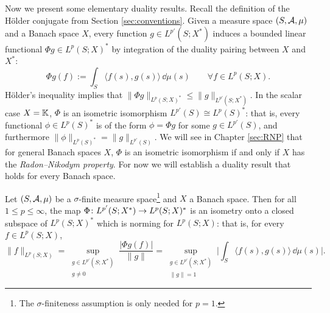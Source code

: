 Now we present some elementary duality results.
Recall the definition of the H\"older conjugate from Section \ref{sec:conventions}.
Given a measure space $(S,\mathcal{A},\mu)$ and a Banach space $X$, every function $g \in L^{p'}(S;X^*)$ induces a bounded linear functional $\Phi g \in L^p(S;X)^*$ by integration of the duality pairing between $X$ and $X^*$:
\begin{equation*}
  \Phi g(f) := \int_S \langle f(s), g(s) \rangle \, \dd\mu(s) \qquad \forall f \in L^p(S;X).
\end{equation*}
H\"older's inequality implies that $\|\Phi g\|_{L^p(S;X)^*} \leq \|g\|_{L^{p'}(S;X^*)}$.
In the scalar case $X = \mathbb{K}$, $\Phi$ is an isometric isomorphism $L^{p'}(S) \cong L^p(S)^*$: that is, every functional $\phi \in L^p(S)^*$ is of the form $\phi = \Phi g$ for some $g \in L^{p'}(S)$, and furthermore $\|\phi\|_{L^p(S)^*} = \|g\|_{L^{p'}(S)}$.
We will see in Chapter \ref{sec:RNP} that for general Banach spaces $X$, $\Phi$ is an isometric isomorphism if and only if $X$ has the \emph{Radon--Nikodym property}.
For now we will establish a duality result that holds for every Banach space.

\begin{prop}\label{prop:bochner-preduality}
  Let $(S,\mathcal{A},\mu)$ be a $\sigma$-finite measure space\footnote{The $\sigma$-finiteness assumption is only needed for $p = 1$.} and $X$ a Banach space.
  Then for all $1 \leq p \leq \infty$, the map $\Phi \colon L^{p'}(S;X^*) \rightarrow L^p(S;X)^*$ is an isometry onto a closed subspace of $L^p(S;X)^*$ which is norming for $L^p(S;X)$: that is, for every $f \in L^p(S;X)$,
  \begin{equation*}
    \|f\|_{L^p(S;X)} = \sup_{\substack{g \in L^{p'}(S;X^*) \\ g \neq 0}} \frac{| \Phi g(f) |}{\|g\|}
    = \sup_{\substack{g \in L^{p'}(S;X^*) \\ \|g\| = 1}} \Big| \int_S \langle f(s), g(s) \rangle \, \dd\mu(s) \Big|.
  \end{equation*}
\end{prop}


